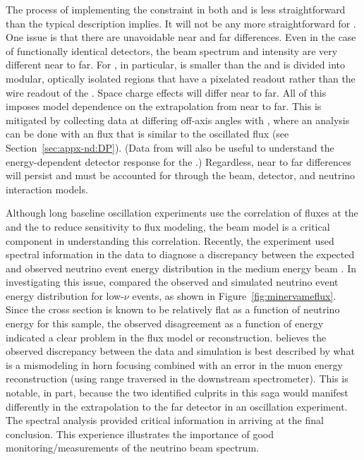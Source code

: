 The process of implementing the   constraint in both  and    is less straightforward than the typical description implies.  It will not be any more straightforward for .  One issue is that there are unavoidable near and far differences. Even in the case of functionally identical detectors, the beam spectrum and intensity are very different near to far.  For , in particular, 
 is smaller than the  and is divided into modular, optically isolated regions that have a pixelated readout rather than the wire readout of the .  Space charge effects will differ near to far.  All of this imposes model dependence on the extrapolation from near to far.  This is mitigated by collecting data at differing off-axis angles with , where an analysis can be done with an  flux that is similar to the oscillated  flux (see Section~\ref{sec:appx-nd:DP}). (Data from  will also be useful to understand the energy-dependent detector response for the .)  Regardless, near to far differences will persist and must be accounted for through the beam, detector, and neutrino interaction models.  

Although long baseline oscillation experiments use the correlation of fluxes at the  and the  to reduce sensitivity to flux modeling, the beam model is a critical component in understanding this correlation.  Recently, the  experiment used spectral information in the data to diagnose a discrepancy between the expected and observed neutrino event energy distribution in the  medium energy beam \cite{JenaNUINT2018}. In investigating this issue,  compared the observed and simulated neutrino event energy distribution for low-$\nu$ events, as shown in Figure~\ref{fig:minervameflux}.  Since the cross section is known to be relatively flat as a function of neutrino energy for this sample, the observed disagreement as a function of energy indicated a clear problem in the flux model or reconstruction.      
 believes the observed discrepancy between the data and simulation is best described by what is a mismodeling in horn focusing combined with an error in the muon energy reconstruction (using range traversed in the downstream spectrometer).  This is notable, in part, because the two identified culprits in this saga would manifest differently in the extrapolation to the far detector in an oscillation experiment. The spectral analysis provided critical information in arriving at the final conclusion.  This experience illustrates the importance of good monitoring/measurements of the neutrino beam spectrum.  

